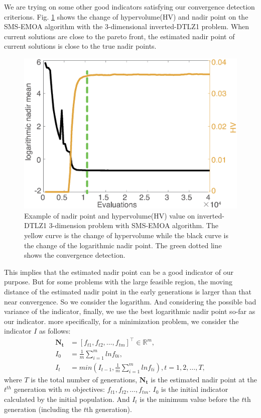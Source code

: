 \documentclass[conference]{IEEEtran}
\begin{document}
We are trying on some other good indicators satisfying our convergence detection criterions. 
Fig. \ref{wcd1} shows the change of hypervolume(HV) and nadir point on the SMS-EMOA algorithm 
with the 3-dimensional inverted-DTLZ1 problem.
When current solutions are close to the pareto front, the estimated nadir point of current solutions is close 
to the true nadir points. 
\begin{figure}[!t]
  \centering
    \includegraphics[width=\columnwidth]{FVEMOA_IDTLZ1_M3_nadir_1}
  \caption{Example of nadir point and hypervolume(HV) value on inverted-DTLZ1 3-dimension problem
  with SMS-EMOA algorithm.
  The yellow curve is the change of hypervolume 
  while the black curve is the change of the logarithmic nadir point.
  The green dotted line shows the convergence detection.
  }
  \label{wcd1}
\end{figure}
This implies that the estimated nadir point can be a good indicator of our purpose. 
But for some problems with the large feasible region, 
the moving distance of the estimated nadir point in the early generations is larger than that near convergence.
So we consider the logarithm. And considering the possible bad variance of the indicator, 
finally, we use the best logarithmic nadir point so-far as our indicator. more specifically,
for a minimization problem, we consider the indicator $I$ as follows:
\begin{equation}\begin{aligned}\label{ewcd1}
  \boldsymbol{N_{t}} &= [f_{t1},f_{t2},\dots,f_{tm}]^\top \in \mathbb{R}^m ,\\
  I_{0} &= \frac{1}{m} \sum_{i=1}^{m}lnf_{0i},\\
  I_{t} &= min(I_{t-1},\frac{1}{m} \sum_{i=1}^{m}lnf_{ti}),
  t = 1,2,\dots,T,
\end{aligned}
\end{equation}
where $T$ is the total number of generations, 
$\boldsymbol{N_{t}}$ is the estimated nadir point at the $t^{th}$ generation with $m$ objectives: $f_{t1},f_{t2},\dots,f_{tm}$. 
$I_0$ is the initial indicator calculated by the initial population.
And $I_t$ is the minimum value before the $t$th generation (including the $t$th generation). 
\end{document}
